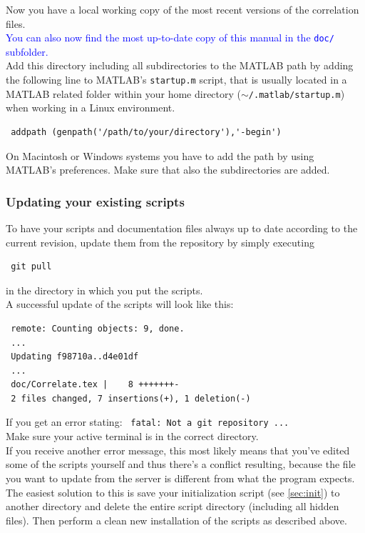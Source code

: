 \documentclass[10pt,a4paper,onepage,DIV12]{scrartcl}
\begin{document}
Now you have a local working copy of the most recent versions of the correlation files.\\
\textcolor{blue}{You can also now find the most up-to-date copy of this manual in the \texttt{doc/} subfolder.}\\

Add this directory including all subdirectories to the MATLAB path by adding the following line to MATLAB's \texttt{startup.m} script, that is usually located in a MATLAB related folder within your home directory (\texttt{$\sim$/.matlab/startup.m}) when working in a Linux environment. 
\begin{verbatim}
 addpath (genpath('/path/to/your/directory'),'-begin')
\end{verbatim}
On Macintosh or Windows systems you have to add the path by using MATLAB's preferences. Make sure that also the subdirectories are added.\\
\subsubsection*{Updating your existing scripts}

To have your scripts and documentation files always up to date according to the current revision, update them from the repository by simply executing
\begin{verbatim}
 git pull
\end{verbatim}
 in the directory in which you put the scripts.\\
 
A successful update of the scripts will look like this:
\begin{verbatim}
 remote: Counting objects: 9, done.
 ...
 Updating f98710a..d4e01df
 ...
 doc/Correlate.tex |    8 +++++++-
 2 files changed, 7 insertions(+), 1 deletion(-)
\end{verbatim}

If you get an error stating: \texttt{
 fatal: Not a git repository ...}\\
Make sure your active terminal is in the correct directory.\\

If you receive another error message, this most likely means that you've edited some of the scripts yourself and thus there's a conflict resulting, because the file you want to update from the server is different from what the program expects. The easiest solution to this is save your initialization script (see \ref{sec:init}) to another directory and delete the entire script directory (including all hidden files). Then perform a clean new installation of the scripts as described above.
\end{document}
